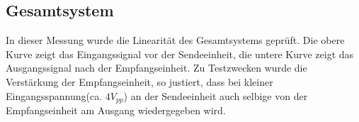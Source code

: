 \subsection{Gesamtsystem}
In dieser Messung wurde die Linearität des Gesamtsystems geprüft. Die obere Kurve zeigt das Eingangssignal vor der Sendeeinheit, die untere Kurve zeigt das Ausgangssignal nach der Empfangseinheit. Zu Testzwecken wurde die Verstärkung der Empfangseinheit, so justiert, dass bei kleiner Eingangsspannung(ca. $4V_{pp}$) an der Sendeeinheit auch selbige von der Empfangseinheit am Ausgang wiedergegeben wird. 
\begin{figure}[H]
  \centering
   \qquad
   \\
   \qquad

\end{figure}
